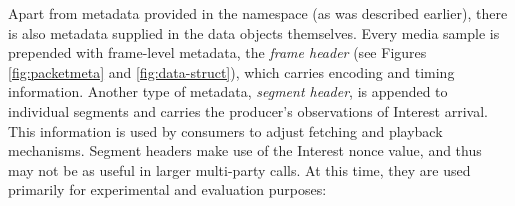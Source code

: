 \documentclass{icn/sig-alternate-2013} %
\newcommand{\ndnrtcName}{NDN-RTC} %
\begin{document}
Apart from metadata provided in the namespace (as was described earlier), there is also metadata supplied in the data objects themselves.
%
Every media sample is prepended with frame-level metadata, the \textit{frame header} (see Figures \ref{fig:packetmeta} and \ref{fig:data-struct}), which carries encoding and timing information. %
Another type of metadata, \textit{segment header}, is appended to individual segments and carries the producer's observations of Interest arrival. This information is used by consumers to adjust fetching and playback mechanisms.  
Segment headers make use of the Interest nonce value, and thus may not be as useful in larger multi-party calls. At this time, they are used primarily for experimental and evaluation purposes:
\end{document}
